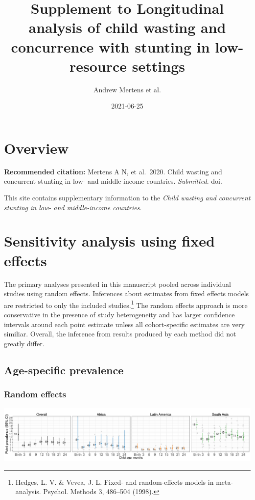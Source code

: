 \documentclass[
  9pt,
]{book}
\title{Supplement to Longitudinal analysis of child wasting and concurrence with stunting in low-resource settings}
\author{Andrew Mertens et al.}
\date{2021-06-25}
\begin{document}
\maketitle

{
\setcounter{tocdepth}{1}
\tableofcontents
}
\hypertarget{overview}{%
\chapter{Overview}\label{overview}}

\textbf{Recommended citation:} Mertens A N, et al.~2020. Child wasting and concurrent stunting in low- and middle-income countries. \emph{Submitted}. doi.

This site contains supplementary information to the \emph{Child wasting and concurrent stunting in low- and middle-income countries}.

\hypertarget{fixed-effects}{%
\chapter{Sensitivity analysis using fixed effects}\label{fixed-effects}}

\raggedright

The primary analyses presented in this manuscript pooled across individual studies using random effects. Inferences about estimates from fixed effects models are restricted to only the included studies.\footnote{Hedges, L. V. \& Vevea, J. L. Fixed- and random-effects models in meta-analysis. Psychol. Methods 3, 486--504 (1998).} The random effects approach is more conservative in the presence of study heterogeneity and has larger confidence intervals around each point estimate unless all cohort-specific estimates are very similiar. Overall, the inference from results produced by each method did not greatly differ.

\hypertarget{age-specific-prevalence}{%
\section{Age-specific prevalence}\label{age-specific-prevalence}}

\hypertarget{random-effects}{%
\subsection{Random effects}\label{random-effects}}

\includegraphics[width=58.33in]{figures/wasting/fig-wast-2-prev-overall_region--allage-primary}
\end{document}
